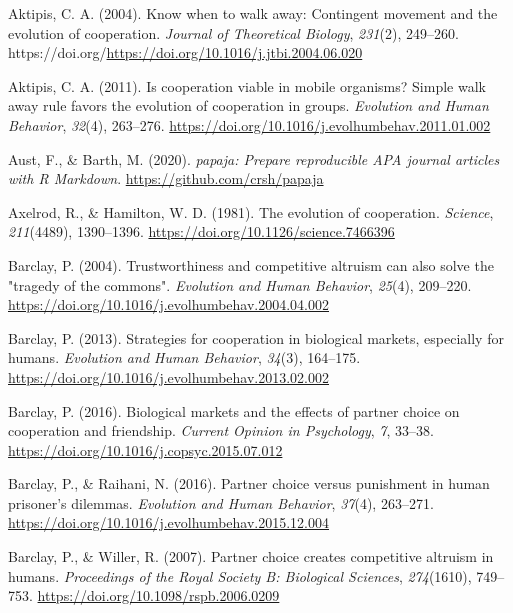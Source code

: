 \documentclass[
  man,floatsintext]{apa6}
\newlength{\cslhangindent}
\newlength{\cslentryspacingunit} %
\newenvironment{CSLReferences}[2] %
 {%
  \setlength{\parindent}{0pt}
  \ifodd #1
  \let\oldpar\par
  \def\par{\hangindent=\cslhangindent\oldpar}
  \fi
  \setlength{\parskip}{#2\cslentryspacingunit}
 }%
 {}
\begin{document}
\hypertarget{refs}{}
\begin{CSLReferences}{1}{0}
\leavevmode{}%
Aktipis, C. A. (2004). Know when to walk away: Contingent movement and the evolution of cooperation. \emph{Journal of Theoretical Biology}, \emph{231}(2), 249--260. https://doi.org/\url{https://doi.org/10.1016/j.jtbi.2004.06.020}

\leavevmode{}%
Aktipis, C. A. (2011). Is cooperation viable in mobile organisms? Simple walk away rule favors the evolution of cooperation in groups. \emph{Evolution and Human Behavior}, \emph{32}(4), 263--276. \url{https://doi.org/10.1016/j.evolhumbehav.2011.01.002}

\leavevmode{}%
Aust, F., \& Barth, M. (2020). \emph{{papaja}: {Prepare} reproducible {APA} journal articles with {R Markdown}}. \url{https://github.com/crsh/papaja}

\leavevmode{}%
Axelrod, R., \& Hamilton, W. D. (1981). The evolution of cooperation. \emph{Science}, \emph{211}(4489), 1390--1396. \url{https://doi.org/10.1126/science.7466396}

\leavevmode{}%
Barclay, P. (2004). Trustworthiness and competitive altruism can also solve the "tragedy of the commons". \emph{Evolution and Human Behavior}, \emph{25}(4), 209--220. \url{https://doi.org/10.1016/j.evolhumbehav.2004.04.002}

\leavevmode{}%
Barclay, P. (2013). Strategies for cooperation in biological markets, especially for humans. \emph{Evolution and Human Behavior}, \emph{34}(3), 164--175. \url{https://doi.org/10.1016/j.evolhumbehav.2013.02.002}

\leavevmode{}%
Barclay, P. (2016). Biological markets and the effects of partner choice on cooperation and friendship. \emph{Current Opinion in Psychology}, \emph{7}, 33--38. \url{https://doi.org/10.1016/j.copsyc.2015.07.012}

\leavevmode{}%
Barclay, P., \& Raihani, N. (2016). Partner choice versus punishment in human prisoner's dilemmas. \emph{Evolution and Human Behavior}, \emph{37}(4), 263--271. \url{https://doi.org/10.1016/j.evolhumbehav.2015.12.004}

\leavevmode{}%
Barclay, P., \& Willer, R. (2007). Partner choice creates competitive altruism in humans. \emph{Proceedings of the Royal Society B: Biological Sciences}, \emph{274}(1610), 749--753. \url{https://doi.org/10.1098/rspb.2006.0209}


\end{CSLReferences}
\end{document}
